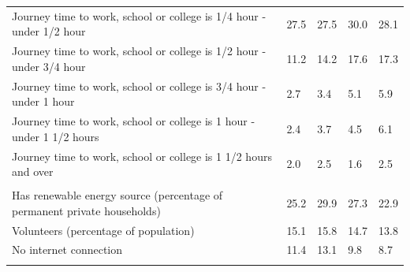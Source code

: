 \documentclass{article}
\begin{document}
\begin{table}[h]
\begin{tabular}{KTTTT}
Journey time to work, school or college is 1/4 hour - under 1/2 hour & 27.5& 27.5& 30.0& 28.1\\
Journey time to work, school or college is 1/2 hour - under 3/4 hour & 11.2& 14.2& 17.6& 17.3\\
Journey time to work, school or college is 3/4 hour - under 1 hour & 2.7& 3.4& 5.1& 5.9\\
Journey time to work, school or college is 1 hour - under 1 1/2 hours & 2.4& 3.7& 4.5& 6.1\\
Journey time to work, school or college is 1 1/2 hours and over & 2.0& 2.5& 1.6& 2.5\\
\hline
    \\ 
    \hline
Has renewable energy source (percentage of permanent private households) & 25.2& 29.9& 27.3& 22.9\\
    \hline
Volunteers (percentage of population) & 15.1& 15.8& 14.7& 13.8\\
    \hline
No internet connection& 11.4& 13.1&  9.8&  8.7\\
\hline
\end{tabular}
\end{table}
\end{document}
